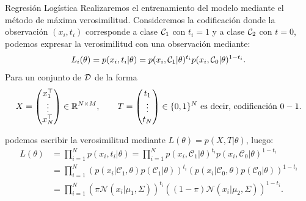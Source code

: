 \documentclass[9pt]{beamer}
\begin{document}
\begin{frame}{Regresión Logística}
Realizaremos el entrenamiento del modelo mediante el método de máxima verosimilitud. \pause
Consideremos la codificación donde la observación $(x_i,t_i)$ corresponde a clase ${\mathcal C}_1$ con $t_i = 1$ y a clase ${\mathcal C}_2$ con  $t=0$, podemos expresar la verosimilitud con una observación mediante:
\begin{equation*}
  L_i(\theta) = p(x_i, t_i|\theta) =  p(x_i,{\mathcal C}_1|\theta)^{t_i}p(x_i,{\mathcal C}_0|\theta)^{1-t_i}. 
\end{equation*} \pause
Para un conjunto de ${\mathcal D}$ de la forma  
\begin{equation*}
X=\left(\begin{matrix}
    x_1^\top\\ \vdots\\ x_N^\top
  \end{matrix}\right)\in\mathbb{R}^{N\times M},\qquad
  T=\left(\begin{matrix}
    t_1\\ \vdots\\ t_N
  \end{matrix}\right)\in\{0,1\}^N \text{ es decir, codificación $0-1$.}
\end{equation*} \pause

podemos escribir la verosimilitud mediante $L(\theta) = p(X,T|\theta) $, luego:
\begin{align*}
  L(\theta) &= \prod_{i=1}^{N}p(x_i,t_i|\theta)
  = \prod_{i=1}^{N}p(x_i,\mathcal{C}_1|\theta)^{t_i}p(x_i,\mathcal{C}_0|\theta)^{1-t_i}\\
  &=\prod_{i=1}^{N}\left(p(x_i|\mathcal{C}_1,\theta)p(\mathcal{C}_1|\theta)\right)^{t_i}\left(p(x_i|\mathcal{C}_0,\theta)p(\mathcal{C}_0|\theta)\right)^{1-t_i}\\
  &= \prod_{i=1}^{N}(\pi\mathcal{N}(x_i|\mu_1,\Sigma))^{t_i}
  ((1-\pi)\mathcal{N}(x_i|\mu_2,\Sigma))^{1-t_i}.
\end{align*}


\end{frame}
\end{document}
